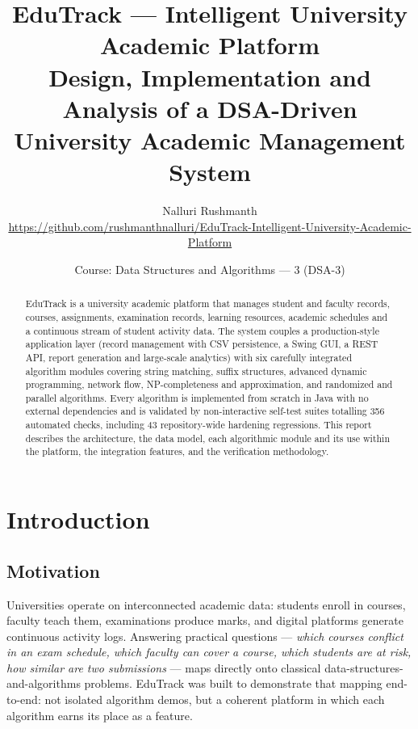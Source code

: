 \documentclass[11pt,a4paper]{article}
\title{\textbf{EduTrack --- Intelligent University Academic Platform}\\
\large Design, Implementation and Analysis of a DSA-Driven\\
University Academic Management System}
\author{Nalluri Rushmanth\\
\small \url{https://github.com/rushmanthnalluri/EduTrack-Intelligent-University-Academic-Platform}}
\date{Course: Data Structures and Algorithms --- 3 (DSA-3)}
\begin{document}
\maketitle

\begin{abstract}
EduTrack is a university academic platform that manages student and faculty records,
courses, assignments, examination records, learning resources, academic schedules and a
continuous stream of student activity data. The system couples a production-style
application layer (record management with CSV persistence, a Swing GUI, a REST API,
report generation and large-scale analytics) with six carefully integrated algorithm
modules covering string matching, suffix structures, advanced dynamic programming,
network flow, NP-completeness and approximation, and randomized and parallel algorithms.
Every algorithm is implemented from scratch in Java with no external dependencies and is
validated by non-interactive self-test suites totalling 356 automated checks, including 43 repository-wide hardening regressions.
This report describes the architecture, the data model, each algorithmic module and its
use within the platform, the integration features, and the verification methodology.
\end{abstract}

\tableofcontents
\newpage

\section{Introduction}

\subsection{Motivation}
Universities operate on interconnected academic data: students enroll in courses, faculty
teach them, examinations produce marks, and digital platforms generate continuous activity
logs. Answering practical questions --- \emph{which courses conflict in an exam schedule,
which faculty can cover a course, which students are at risk, how similar are two
submissions} --- maps directly onto classical data-structures-and-algorithms problems.
EduTrack was built to demonstrate that mapping end-to-end: not isolated algorithm demos,
but a coherent platform in which each algorithm earns its place as a feature.
\end{document}

